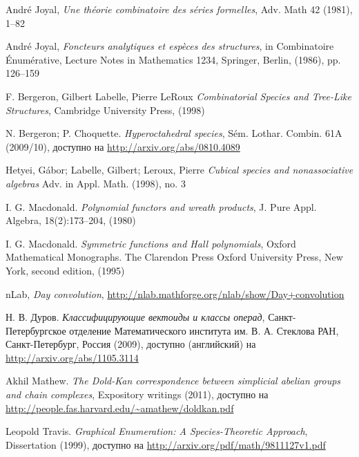 \begin{thebibliography}{9}

 André Joyal, \emph{Une théorie combinatoire des séries
formelles}, Adv. Math 42 (1981), 1–82

 André Joyal, \emph{Foncteurs analytiques et espèces des
structures}, in Combinatoire Énumérative, Lecture Notes in Mathematics 1234, Springer,
Berlin, (1986), pp. 126–159

 F. Bergeron, Gilbert Labelle, Pierre LeRoux
\emph{Combinatorial Species and Tree-Like Structures}, Cambridge University Press, (1998)

 N. Bergeron; P. Choquette.
\emph{Hyperoctahedral species}, Sém. Lothar. Combin. 61A (2009/10), доступно на
\url{http://arxiv.org/abs/0810.4089}

 Hetyei, Gábor; Labelle, Gilbert;
Leroux, Pierre \emph{Cubical species and nonassociative algebras} Adv. in Appl.
Math. (1998), no. 3

 I. G. Macdonald. \emph{Polynomial functors and wreath
products}, J. Pure Appl. Algebra, 18(2):173–204, (1980)

 I. G. Macdonald. \emph{Symmetric functions and Hall polynomials},
Oxford Mathematical Monographs.
The Clarendon Press Oxford University Press, New York, second edition, (1995)

 nLab, \emph{Day convolution},
\url{http://nlab.mathforge.org/nlab/show/Day+convolution}

 Н. В. Дуров. \emph{Классифицирующие вектоиды и классы операд},
Санкт-Петербургское отделение Математического института им. В. А. Стеклова РАН,
Санкт-Петербург, Россия (2009), доступно (английский) на
\url{http://arxiv.org/abs/1105.3114}

 Akhil Mathew. \emph{The Dold-Kan correspondence between
simplicial abelian groups and chain complexes}, Expository writings (2011),
доступно на \url{http://people.fas.harvard.edu/~amathew/doldkan.pdf}

 Leopold Travis. \emph{Graphical Enumeration: A
Species-Theoretic Approach}, Dissertation (1999), доступно на
\url{http://arxiv.org/pdf/math/9811127v1.pdf}

\end{thebibliography}